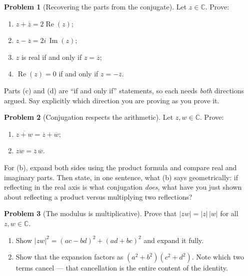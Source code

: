 \documentclass[11pt]{article}
\theoremstyle{definition}
\newtheorem{prob}{Problem}[section]
\newcommand{\C}{\mathbb{C}}
\newcommand{\conj}[1]{\overline{#1}}
\newcommand{\Rez}{\operatorname{Re}}
\newcommand{\Imz}{\operatorname{Im}}
\begin{document}
\begin{prob}[Recovering the parts from the conjugate]
Let $z\in\C$. Prove:
\begin{enumerate}[label=\textbf{(\alph*)},leftmargin=2.6em,itemsep=7pt,topsep=6pt]
  \item $z+\conj{z} = 2\Rez(z)$;
  \item $z-\conj{z} = 2i\,\Imz(z)$;
  \item $z$ is real if and only if $z=\conj{z}$;
  \item $\Rez(z)=0$ if and only if $z=-\conj{z}$.
\end{enumerate}

\noindent Parts (c) and (d) are ``if and only if'' statements, so each needs
\emph{both} directions argued. Say explicitly which direction you are proving as
you prove it.
\end{prob}

\begin{prob}[Conjugation respects the arithmetic]
Let $z,w\in\C$. Prove:
\begin{enumerate}[label=\textbf{(\alph*)},leftmargin=2.6em,itemsep=7pt,topsep=6pt]
  \item $\conj{z+w} = \conj{z}+\conj{w}$;
  \item $\conj{zw} = \conj{z}\,\conj{w}$.
\end{enumerate}

\noindent For (b), expand both sides using the product formula and compare real
and imaginary parts. Then state, in one sentence, what (b) says
geometrically: if reflecting in the real axis is what conjugation \emph{does},
what have you just shown about reflecting a product versus multiplying two
reflections?
\end{prob}

\begin{prob}[The modulus is multiplicative]
Prove that $\lvert zw\rvert = \lvert z\rvert\,\lvert w\rvert$ for all
$z,w\in\C$.

\begin{enumerate}[label=\textbf{(\alph*)},leftmargin=2.6em,itemsep=7pt,topsep=6pt]
  \item Show $\lvert zw\rvert^{2} = (ac-bd)^{2}+(ad+bc)^{2}$ and expand it fully.
  \item Show that the expansion factors as $(a^{2}+b^{2})(c^{2}+d^{2})$. Note
        which two terms cancel --- that cancellation is the entire content of the
        identity.
\end{enumerate}
\end{prob}
\end{document}
